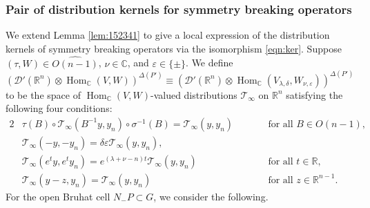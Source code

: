 \subsubsection{Pair of distribution kernels
 for symmetry breaking operators}
\label{subsec:Tpair}

We extend Lemma \ref{lem:152341}
 to give a local expression
 of the distribution kernels
 of symmetry breaking operators
 via the isomorphism \eqref{eqn:ker}.  
Suppose $(\tau,W) \in \widehat{O(n-1)}$, 
 $\nu \in {\mathbb{C}}$, 
and $\varepsilon \in \{ \pm \}$.  
We define 
\begin{equation}
\label{eqn:DVWinfty}
   ({\mathcal{D}}'({\mathbb{R}}^n)
    \otimes 
    \operatorname{Hom}_{{\mathbb{C}}}(V,W))^{\Delta(P')}
   \equiv
({\mathcal{D}}'({\mathbb{R}}^n)
    \otimes 
    \operatorname{Hom}_{{\mathbb{C}}}(V_{\lambda, \delta},W_{\nu,\varepsilon})
   )^{\Delta(P')}
\end{equation}
 to be the space of $\operatorname{Hom}_{{\mathbb{C}}}(V,W)$-valued
 distributions ${\mathcal{T}}_{\infty}$ on ${\mathbb{R}}^n$
satisfying the following four conditions:
\begin{alignat}{2}
\label{eqn:152345a}
& \tau(B) \circ {\mathcal{T}}_{\infty}(B^{-1} y,y_n) \circ \sigma^{-1}(B)
  ={\mathcal{T}}_{\infty}(y,y_n)
\qquad
&&\text{for all } B \in O(n-1), 
\\
\label{eqn:152345b}
& {\mathcal{T}}_{\infty}(-y,-y_n)= \delta \varepsilon {\mathcal{T}}_{\infty}(y,y_n), 
&&
\\
\label{eqn:152345c}
& {\mathcal{T}}_{\infty}(e^t y,e^t y_n)= e^{(\lambda+\nu-n)t}{\mathcal{T}}_{\infty}(y,y_n)
\quad
&&\text{for all }t \in {\mathbb{R}}, 
\\
\label{eqn:152345d}
& {\mathcal{T}}_{\infty}(y-z,y_n)={\mathcal{T}}_{\infty}(y,y_n)
\quad
&&\text{for all }z \in {\mathbb{R}}^{n-1}.  
\end{alignat}
For the open Bruhat cell $N_- P \subset G$, 
 we consider the following.  
